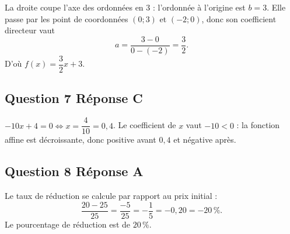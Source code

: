 La droite coupe l'axe des ordonnées en 3 : l'ordonnée à l'origine est $b = 3$. Elle passe par les point de coordonnées $(0 ; 3)$ et $(-2 ; 0)$, donc son coefficient directeur vaut
\[a = \dfrac{3 - 0}{0 - (-2)} = \dfrac{3}{2}.\]
D'où $f(x) = \dfrac{3}{2}x + 3$.

\subsection*{Question 7 \quad Réponse C}

$-10x + 4 = 0 \iff x = \dfrac{4}{10} = 0,4$. Le coefficient de $x$ vaut $-10 < 0$ : la
fonction affine est décroissante, donc positive avant $0,4$ et négative après.

\subsection*{Question 8 \quad Réponse A}

Le taux de réduction se calcule par rapport au prix initial :
\[\dfrac{20-25}{25} = \dfrac{-5}{25} = -\dfrac{1}{5} = -0,20 = -20\,\%.\]
Le pourcentage de réduction est de $20\,\%$.
